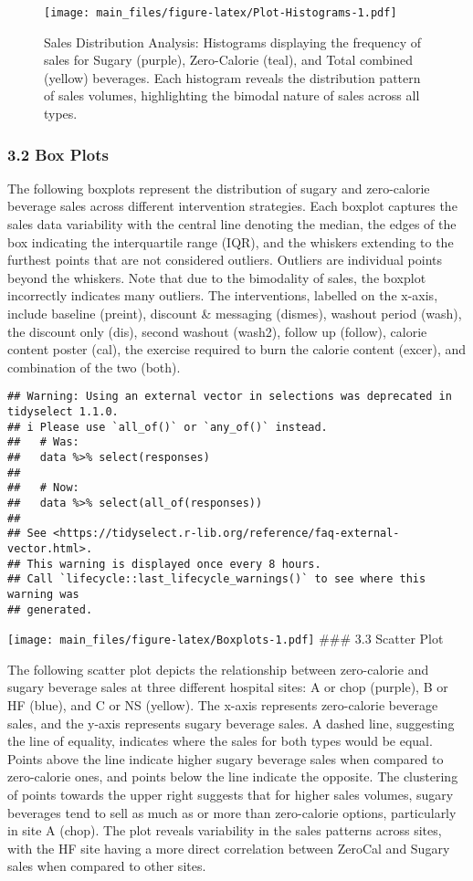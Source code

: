 \documentclass[
]{article}
\begin{document}
\begin{figure}
\centering
\texttt{[image: main\_files/figure-latex/Plot-Histograms-1.pdf]}
\caption{Sales Distribution Analysis: Histograms displaying the
frequency of sales for Sugary (purple), Zero-Calorie (teal), and Total
combined (yellow) beverages. Each histogram reveals the distribution
pattern of sales volumes, highlighting the bimodal nature of sales
across all types.}
\end{figure}

\hypertarget{box-plots}{%
\subsubsection{3.2 Box Plots}\label{box-plots}}

The following boxplots represent the distribution of sugary and
zero-calorie beverage sales across different intervention strategies.
Each boxplot captures the sales data variability with the central line
denoting the median, the edges of the box indicating the interquartile
range (IQR), and the whiskers extending to the furthest points that are
not considered outliers. Outliers are individual points beyond the
whiskers. Note that due to the bimodality of sales, the boxplot
incorrectly indicates many outliers. The interventions, labelled on the
x-axis, include baseline (preint), discount \& messaging (dismes),
washout period (wash), the discount only (dis), second washout (wash2),
follow up (follow), calorie content poster (cal), the exercise required
to burn the calorie content (excer), and combination of the two (both).

\begin{verbatim}
## Warning: Using an external vector in selections was deprecated in tidyselect 1.1.0.
## i Please use `all_of()` or `any_of()` instead.
##   # Was:
##   data %>% select(responses)
## 
##   # Now:
##   data %>% select(all_of(responses))
## 
## See <https://tidyselect.r-lib.org/reference/faq-external-vector.html>.
## This warning is displayed once every 8 hours.
## Call `lifecycle::last_lifecycle_warnings()` to see where this warning was
## generated.
\end{verbatim}

\texttt{[image: main\_files/figure-latex/Boxplots-1.pdf]} \#\#\# 3.3
Scatter Plot

The following scatter plot depicts the relationship between zero-calorie
and sugary beverage sales at three different hospital sites: A or chop
(purple), B or HF (blue), and C or NS (yellow). The x-axis represents
zero-calorie beverage sales, and the y-axis represents sugary beverage
sales. A dashed line, suggesting the line of equality, indicates where
the sales for both types would be equal. Points above the line indicate
higher sugary beverage sales when compared to zero-calorie ones, and
points below the line indicate the opposite. The clustering of points
towards the upper right suggests that for higher sales volumes, sugary
beverages tend to sell as much as or more than zero-calorie options,
particularly in site A (chop). The plot reveals variability in the sales
patterns across sites, with the HF site having a more direct correlation
between ZeroCal and Sugary sales when compared to other sites.
\end{document}
